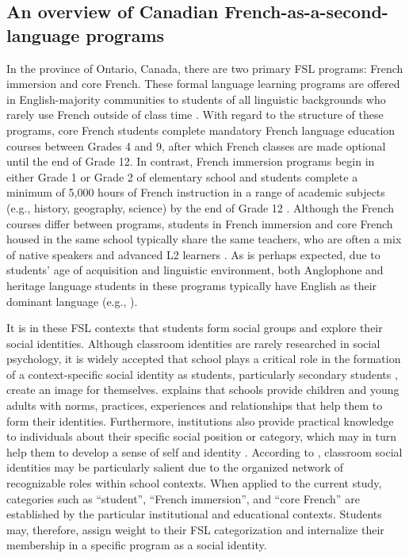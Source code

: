 \documentclass[output=paper,colorlinks,citecolor=brown,draftmode]{langscibook}
\begin{document}
\subsection{An overview of Canadian French-as-a-second-language programs}\label{sec:11:2.2}
In the province of Ontario, Canada, there are two primary FSL programs: French immersion and core French. These formal language learning programs are offered in English-majority communities to students of all linguistic backgrounds who rarely use French outside of class time \citep{Genesee1978}. With regard to the structure of these programs, core French students complete mandatory French language education courses between Grades 4 and 9, after which French classes are made optional until the end of Grade 12. In contrast, French immersion programs begin in either Grade 1 or Grade 2 of elementary school and students complete a minimum of 5,000 hours of French instruction in a range of academic subjects (e.g., history, geography, science) by the end of Grade 12 \citep{CanadianParentsforFrench2017}. Although the French courses differ between programs, students in French immersion and core French housed in the same school typically share the same teachers, who are often a mix of native speakers and advanced L2 learners \citep{NetelenbosRosen2016}. As is perhaps expected, due to students’ age of acquisition and linguistic environment, both Anglophone and heritage language students in these programs typically have English as their dominant language (e.g., \citealt{Birdsong2014}).


It is in these FSL contexts that students form social groups and explore their social identities. Although classroom identities are rarely researched in social psychology, it is widely accepted that school plays a critical role in the formation of a context-specific social identity as students, particularly secondary students \citep{McLeod2000}, create an image for themselves. \citet{Perry2002} explains that schools provide children and young adults with norms, practices, experiences and relationships that help them to form their identities. Furthermore, institutions also provide practical knowledge to individuals about their specific social position or category, which may in turn help them to develop a sense of self and identity \citep{MacKinnonHeise2010}. According to \citet{Jenkins:2014}, classroom social identities may be particularly salient due to the organized network of recognizable roles within school contexts. When applied to the current study, categories such as “student”, “French immersion”, and “core French” are established by the particular institutional and educational contexts. Students may, therefore, assign weight to their FSL categorization and internalize their membership in a specific program as a social identity.
\end{document}
